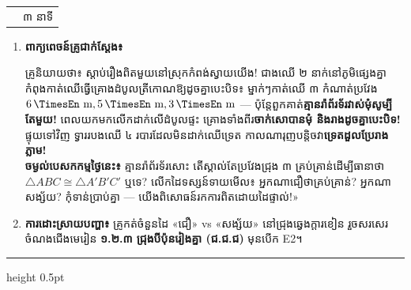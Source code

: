 \documentclass[a4paper,12pt]{article}
\makeatletter
\newcommand{\en}[1]{{\TimesEn #1}}
\newcommand{\enbf}[1]{{\TimesEn\textbf{#1}}}
\newcommand{\unit}[1]{\,\text{\en{#1}}}
\newcommand{\tri}[1]{\ensuremath{\triangle #1}}
\newcommand{\cg}{\ensuremath{\cong}}
\newenvironment{phasebox}[3]{%
  \needspace{2.2cm}%
  \begin{tcolorbox}[
    enhanced, sharp corners, colback=headgray, colframe=black,
    boxrule=1.0pt, top=3.5pt, bottom=3.5pt, left=9pt, right=9pt,
    before skip=6pt, after skip=3pt
  ]%
    \linespread{1.0}\selectfont\renewcommand{\arraystretch}{1.0}%
    \begin{tabular*}{\linewidth}{@{}>{\raggedright\arraybackslash}p{13.10cm}@{\extracolsep{\fill}}r@{}}
      {\muol\fontsize{11pt}{14.5pt}\selectfont #1} & {\fontsize{10.5pt}{13.5pt}\selectfont\en{#2 |} #3}%
    \end{tabular*}%
  \end{tcolorbox}%
  \begingroup\fontsize{11.5pt}{14.92pt}\selectfont
}{%
  \par\endgroup\vspace{3pt}\hrule height 0.5pt\vspace{4pt}%
}
\makeatother
\begin{document}
\begin{phasebox}{ជំហានទី ២ \enbf{(}គ\enbf{) --- E1 Engage}៖ អាថ៌កំបាំងគ្រោងដំបូលកំពង់ស្វាយ}{08--11 min}{៣ នាទី}
  \begin{enumerate}[leftmargin=0.45cm, topsep=1.5pt, itemsep=2.2pt, parsep=0pt]
    \item \textbf{ពាក្យពេចន៍គ្រូជាក់ស្ដែង៖}
      \begin{scriptbox}
        {\muol\fontsize{10.8pt}{14.5pt}\selectfont \enbf{«}គ្រូនិយាយថា៖} ស្ដាប់រឿងពិតមួយនៅស្រុកកំពង់ស្វាយយើង! ជាងឈើ ២ នាក់នៅភូមិផ្សេងគ្នាកំពុងកាត់ឈើធ្វើគ្រោងដំបូលត្រីកោណឱ្យដូចគ្នាបេះបិទ៖ ម្នាក់ៗកាត់ឈើ ៣ កំណាត់ប្រវែង \textbf{$6\unit{m}, 5\unit{m}, 3\unit{m}$} — ប៉ុន្តែពួកគាត់\textbf{គ្មានរ៉ាព័រទ័រវាស់មុំសូម្បីតែមួយ!} ពេលយកមកលើកដាក់លើដំបូលផ្ទះ គ្រោងទាំងពីរ\textbf{ចាក់សោបានមុំ និងរាងដូចគ្នាបេះបិទ!} ផ្ទុយទៅវិញ ទ្វាររបងឈើ ៤ របារដែលមិនដាក់ឈើទ្រេត កាលណារុញបន្តិចវា\textbf{ទ្រេតដួលប្រែរាងភ្លាម!}\\
        \textbf{ចម្ងល់បេសកកម្មថ្ងៃនេះ៖} គ្មានរ៉ាព័រទ័រសោះ តើស្គាល់តែប្រវែងជ្រុង ៣ គ្រប់គ្រាន់ដើម្បីធានាថា $\tri{ABC} \cg \tri{A'B'C'}$ ឬទេ? លើកដៃទស្សន៍ទាយមើល៖ អ្នកណាជឿថាគ្រប់គ្រាន់? អ្នកណាសង្ស័យ? កុំទាន់ប្រាប់គ្នា — យើងពិសោធន៍រកការពិតដោយដៃផ្ទាល់!»
      \end{scriptbox}
    \item \textbf{ការដោះស្រាយបញ្ហា៖} គ្រូកត់ចំនួនដៃ «ជឿ» vs «សង្ស័យ» នៅជ្រុងឆ្វេងក្ដារខៀន រួចសរសេរចំណងជើងមេរៀន \textbf{១.២.៣ ជ្រុងបីប៉ុនរៀងគ្នា (ជ.ជ.ជ)} មុនបើក \en{E2}។
  \end{enumerate}
\end{phasebox}
\end{document}
